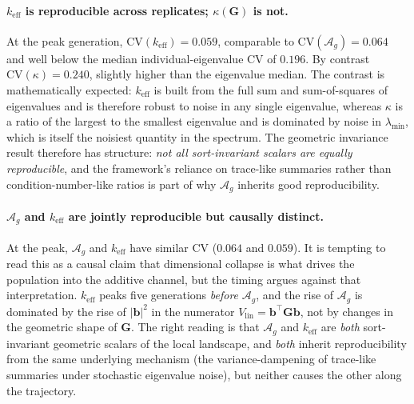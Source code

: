 \documentclass[9pt,twocolumn,twoside,lineno]{gsajnl}
\newcommand{\vect}[1]{\boldsymbol{#1}}
\newcommand{\mat}[1]{\mathbf{#1}}
\newcommand{\Ag}{\ensuremath{\mathcal{A}_{g}}\xspace}
\newcommand{\Vlin}{\ensuremath{V_{\text{lin}}}\xspace}
\newcommand{\keff}{\ensuremath{k_{\mathrm{eff}}}\xspace}
\begin{document}
\paragraph{\keff is reproducible across replicates; $\kappa(\mat{G})$ is not.} 
At the peak generation, $\mathrm{CV}(\keff) = 0.059$, comparable to $\mathrm{CV}(\Ag) = 0.064$ and well below the median individual-eigenvalue CV of $0.196$. By contrast $\mathrm{CV}(\kappa) = 0.240$, slightly higher than the eigenvalue median. The contrast is mathematically expected: \keff is built from the full sum and sum-of-squares of eigenvalues and is therefore robust to noise in any single eigenvalue, whereas $\kappa$ is a ratio of the largest to the smallest eigenvalue and is dominated by noise in $\lambda_{\min}$, which is itself the noisiest quantity in the spectrum. The geometric invariance result therefore has structure: \emph{not all sort-invariant scalars are equally reproducible}, and the framework's reliance on trace-like summaries rather than condition-number-like ratios is part of why \Ag inherits good reproducibility.

\paragraph{$\Ag$ and \keff are jointly reproducible but causally distinct.} 
At the peak, \Ag and \keff have similar CV ($0.064$ and $0.059$). It is tempting to read this as a causal claim that dimensional collapse is what drives the population into the additive channel, but the timing argues against that interpretation. \keff peaks five generations \emph{before} \Ag, and the rise of \Ag is dominated by the rise of $|\vect{b}|^2$ in the numerator $\Vlin = \vect{b}^{\top}\mat{G}\vect{b}$, not by changes in the geometric shape of $\mat{G}$. The right reading is that \Ag and \keff are \emph{both} sort-invariant geometric scalars of the local landscape, and \emph{both} inherit reproducibility from the same underlying mechanism (the variance-dampening of trace-like summaries under stochastic eigenvalue noise), but neither causes the other along the trajectory.
\end{document}

